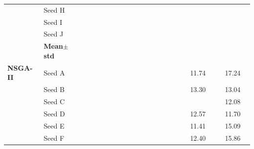 \begin{table}[H]
{\begin{tabular}{@{}llccccc@{}}
 & Seed H & \cellcolor{RoyalBlue!10}{\small 2.18} & \cellcolor{RoyalBlue!10}{\small 3.75} & \cellcolor{RoyalBlue!10}{\small 3.08} & \cellcolor{RoyalBlue!10}{\small 4.48} & \cellcolor{RoyalBlue!10}{\small 5.01} \\
 & Seed I & \cellcolor{RoyalBlue!10}{\small 2.47} & \cellcolor{RoyalBlue!10}{\small 3.51} & \cellcolor{RoyalBlue!10}{\small 4.33} & \cellcolor{RoyalBlue!10}{\small 6.61} & \cellcolor{RoyalBlue!10}{\small 5.69} \\
 & Seed J & \cellcolor{RoyalBlue!10}{\small 2.26} & \cellcolor{RoyalBlue!10}{\small 3.51} & \cellcolor{RoyalBlue!10}{\small 3.17} & \cellcolor{RoyalBlue!10}{\small 4.31} & \cellcolor{RoyalBlue!10}{\small 4.98} \\
 & \textbf{Mean$\pm$std} & \cellcolor{RoyalBlue!65}\textcolor{white}{\textbf{2.29$\pm$0.24}} & \cellcolor{RoyalBlue!65}\textcolor{white}{\textbf{3.41$\pm$0.37}} & \cellcolor{RoyalBlue!65}\textcolor{white}{\textbf{3.69$\pm$0.66}} & \cellcolor{RoyalBlue!65}\textcolor{white}{\textbf{4.74$\pm$1.01}} & \cellcolor{RoyalBlue!65}\textcolor{white}{\textbf{5.41$\pm$1.06}} \\
\midrule
\textbf{NSGA-II} & Seed A & \cellcolor{RoyalBlue!10}{\small 2.96} & \cellcolor{RoyalBlue!10}{\small 4.96} & \cellcolor{RoyalBlue!10}{\small 7.59} & {\small\color{gray!60!black}11.74} & {\small\color{gray!60!black}17.24} \\
 & Seed B & \cellcolor{RoyalBlue!10}{\small 3.59} & \cellcolor{RoyalBlue!10}{\small 5.61} & \cellcolor{RoyalBlue!10}{\small 9.05} & {\small\color{gray!60!black}13.30} & {\small\color{gray!60!black}13.04} \\
 & Seed C & \cellcolor{RoyalBlue!10}{\small 3.45} & \cellcolor{RoyalBlue!10}{\small 7.46} & \cellcolor{RoyalBlue!10}{\small 8.40} & \cellcolor{RoyalBlue!10}{\small 8.05} & {\small\color{gray!60!black}12.08} \\
 & Seed D & \cellcolor{RoyalBlue!10}{\small 3.70} & \cellcolor{RoyalBlue!10}{\small 6.43} & \cellcolor{RoyalBlue!10}{\small 8.63} & {\small\color{gray!60!black}12.57} & {\small\color{gray!60!black}11.70} \\
 & Seed E & \cellcolor{RoyalBlue!10}{\small 3.39} & \cellcolor{RoyalBlue!10}{\small 6.47} & \cellcolor{RoyalBlue!10}{\small 9.39} & {\small\color{gray!60!black}11.41} & {\small\color{gray!60!black}15.09} \\
 & Seed F & \cellcolor{RoyalBlue!10}{\small 3.59} & \cellcolor{RoyalBlue!10}{\small 7.22} & \cellcolor{RoyalBlue!10}{\small 6.40} & {\small\color{gray!60!black}12.40} & {\small\color{gray!60!black}15.86} \\

\end{tabular}}
\end{table}
